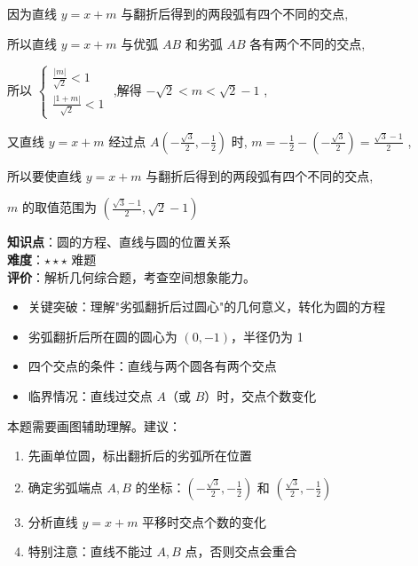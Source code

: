 \documentclass[10pt]{article}
\begin{document}
因为直线 \(y = x + m\) 与翻折后得到的两段弧有四个不同的交点,

所以直线 \(y = x + m\) 与优弧 \({AB}\) 和劣弧 \({AB}\) 各有两个不同的交点,

所以 \(\left\{  \begin{array}{l} \frac{\left| m\right| }{\sqrt{2}} < 1 \\  \frac{\left| 1 + m\right| }{\sqrt{2}} < 1 \end{array}\right.\) ,解得 \(- \sqrt{2} < m < \sqrt{2} - 1\) ,

又直线 \(y = x + m\) 经过点 \(A\left( {-\frac{\sqrt{3}}{2}, - \frac{1}{2}}\right)\) 时, \(m =  - \frac{1}{2} - \left( {-\frac{\sqrt{3}}{2}}\right)  = \frac{\sqrt{3} - 1}{2}\) ,

所以要使直线 \(y = x + m\) 与翻折后得到的两段弧有四个不同的交点,

\(m\) 的取值范围为 \(\left( {\frac{\sqrt{3} - 1}{2},\sqrt{2} - 1}\right)\)

\begin{analysisbox}[考点分析]
\textbf{知识点}：圆的方程、直线与圆的位置关系\\
\textbf{难度}：\(\star\star\star\) 难题\\
\textbf{评价}：解析几何综合题，考查空间想象能力。
\begin{itemize}
\item 关键突破：理解"劣弧翻折后过圆心"的几何意义，转化为圆的方程
\item 劣弧翻折后所在圆的圆心为 \((0, -1)\)，半径仍为 1
\item 四个交点的条件：直线与两个圆各有两个交点
\item 临界情况：直线过交点 \(A\)（或 \(B\)）时，交点个数变化
\end{itemize}
\end{analysisbox}

\begin{tipbox}[教学提示]
本题需要画图辅助理解。建议：
\begin{enumerate}
\item 先画单位圆，标出翻折后的劣弧所在位置
\item 确定劣弧端点 \(A, B\) 的坐标：\((-\frac{\sqrt{3}}{2}, -\frac{1}{2})\) 和 \((\frac{\sqrt{3}}{2}, -\frac{1}{2})\)
\item 分析直线 \(y = x + m\) 平移时交点个数的变化
\item 特别注意：直线不能过 \(A, B\) 点，否则交点会重合
\end{enumerate}
\end{tipbox}
\end{document}
